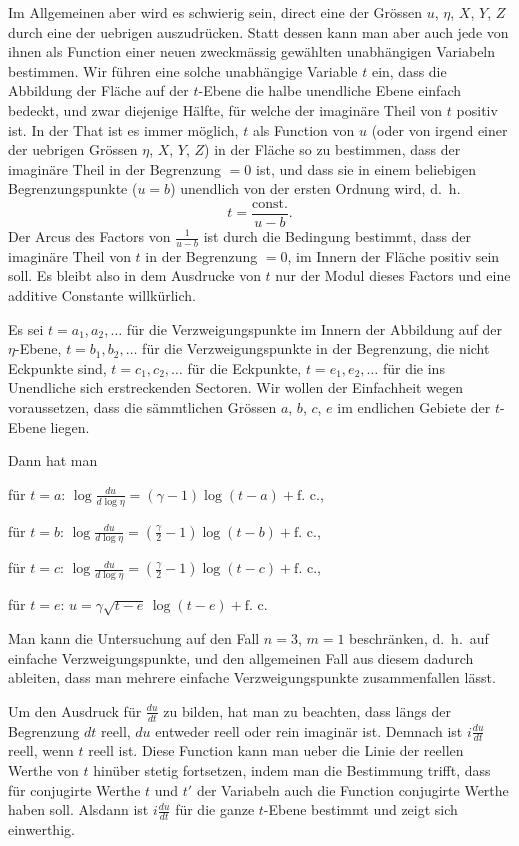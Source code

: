 \documentclass[12pt,a4paper]{article}
\begin{document}
Im Allgemeinen aber wird es schwierig sein, direct eine der Gr\"ossen $u$, $\eta$, $X$, $Y$, $Z$ durch eine der uebrigen auszudr\"ucken. Statt dessen kann man aber auch jede von ihnen als Function einer neuen zweckm\"assig gew\"ahlten unabh\"angigen Variabeln bestimmen. Wir f\"uhren eine solche unabh\"angige Variable $t$ ein, dass die Abbildung der Fl\"ache auf der $t$-Ebene die halbe unendliche Ebene einfach bedeckt, und zwar diejenige H\"alfte, f\"ur welche der imagin\"are Theil von $t$ positiv ist. In der That ist es immer m\"oglich, $t$ als Function von $u$ (oder von irgend einer der uebrigen Gr\"ossen $\eta$, $X$, $Y$, $Z$) in der Fl\"ache so zu bestimmen, dass der imagin\"are Theil in der Begrenzung $=0$ ist, und dass sie in einem beliebigen Begrenzungspunkte ($u=b$) unendlich von der ersten Ordnung wird, d.\ h.
\[t = \frac{\text{const.}}{u-b}.\]
Der Arcus des Factors von $\frac{1}{u-b}$ ist durch die Bedingung bestimmt, dass der imagin\"are Theil von $t$ in der Begrenzung $=0$, im Innern der Fl\"ache positiv sein soll. Es bleibt also in dem Ausdrucke von $t$ nur der Modul dieses Factors und eine additive Constante willk\"urlich.

Es sei $t = a_{1}, a_{2}, \dots$ f\"ur die Verzweigungspunkte im Innern der Abbildung auf der $\eta$-Ebene, $t = b_{1}, b_{2}, \dots$ f\"ur die Verzweigungspunkte in der Begrenzung, die nicht Eckpunkte sind, $t = c_{1}, c_{2}, \dots$ f\"ur die Eckpunkte, $t = e_{1}, e_{2}, \dots$ f\"ur die ins Unendliche sich erstreckenden Sectoren. Wir wollen der Einfachheit wegen voraussetzen, dass die s\"ammtlichen Gr\"ossen $a$, $b$, $c$, $e$ im endlichen Gebiete der $t$-Ebene liegen.

Dann hat man

f\"ur $t = a$: $\log\frac{du}{d\log\eta} = (\gamma - 1)\log(t-a) + \text{f.\ c.}$,

f\"ur $t = b$: $\log\frac{du}{d\log\eta} = \left(\frac{\gamma}{2} - 1\right)\log(t-b) + \text{f.\ c.}$,

f\"ur $t = c$: $\log\frac{du}{d\log\eta} = \left(\frac{\gamma}{2} - 1\right)\log(t-c) + \text{f.\ c.}$,

f\"ur $t = e$: $u = \gamma\sqrt{t-e}\, \log(t-e) + \text{f.\ c.}$

\newpage
Man kann die Untersuchung auf den Fall $n=3$, $m=1$ beschr\"anken, d.\ h.\ auf einfache Verzweigungspunkte, und den allgemeinen Fall aus diesem dadurch ableiten, dass man mehrere einfache Verzweigungspunkte zusammenfallen l\"asst.

Um den Ausdruck f\"ur $\frac{du}{dt}$ zu bilden, hat man zu beachten, dass l\"angs der Begrenzung $dt$ reell, $du$ entweder reell oder rein imagin\"ar ist. Demnach ist $i\frac{du}{dt}$ reell, wenn $t$ reell ist. Diese Function kann man ueber die Linie der reellen Werthe von $t$ hin\"uber stetig fortsetzen, indem man die Bestimmung trifft, dass f\"ur conjugirte Werthe $t$ und $t'$ der Variabeln auch die Function conjugirte Werthe haben soll. Alsdann ist $i\frac{du}{dt}$ f\"ur die ganze $t$-Ebene bestimmt und zeigt sich einwerthig.
\end{document}
